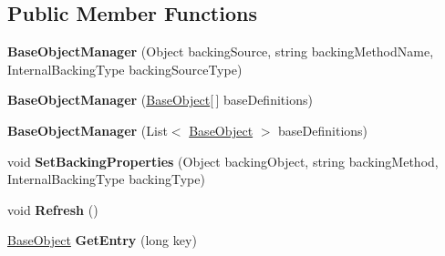 \subsection*{Public Member Functions}
\begin{DoxyCompactItemize}
\item 
\hypertarget{class_s_e_mod_a_p_i_internal_1_1_a_p_i_1_1_entity_1_1_base_object_manager_a69642b2f78b6751eb5fbea3c7a9bfd5d}{}{\bfseries Base\+Object\+Manager} (Object backing\+Source, string backing\+Method\+Name, Internal\+Backing\+Type backing\+Source\+Type)\label{class_s_e_mod_a_p_i_internal_1_1_a_p_i_1_1_entity_1_1_base_object_manager_a69642b2f78b6751eb5fbea3c7a9bfd5d}

\item 
\hypertarget{class_s_e_mod_a_p_i_internal_1_1_a_p_i_1_1_entity_1_1_base_object_manager_a27efb40f1e7172fd4911c3080168f550}{}{\bfseries Base\+Object\+Manager} (\hyperlink{class_s_e_mod_a_p_i_internal_1_1_a_p_i_1_1_entity_1_1_base_object}{Base\+Object}\mbox{[}$\,$\mbox{]} base\+Definitions)\label{class_s_e_mod_a_p_i_internal_1_1_a_p_i_1_1_entity_1_1_base_object_manager_a27efb40f1e7172fd4911c3080168f550}

\item 
\hypertarget{class_s_e_mod_a_p_i_internal_1_1_a_p_i_1_1_entity_1_1_base_object_manager_a8dbcd388b48cdcfe046a401454041401}{}{\bfseries Base\+Object\+Manager} (List$<$ \hyperlink{class_s_e_mod_a_p_i_internal_1_1_a_p_i_1_1_entity_1_1_base_object}{Base\+Object} $>$ base\+Definitions)\label{class_s_e_mod_a_p_i_internal_1_1_a_p_i_1_1_entity_1_1_base_object_manager_a8dbcd388b48cdcfe046a401454041401}

\item 
\hypertarget{class_s_e_mod_a_p_i_internal_1_1_a_p_i_1_1_entity_1_1_base_object_manager_a26d8d8f55e6a15f4cce8f327671daacc}{}void {\bfseries Set\+Backing\+Properties} (Object backing\+Object, string backing\+Method, Internal\+Backing\+Type backing\+Type)\label{class_s_e_mod_a_p_i_internal_1_1_a_p_i_1_1_entity_1_1_base_object_manager_a26d8d8f55e6a15f4cce8f327671daacc}

\item 
\hypertarget{class_s_e_mod_a_p_i_internal_1_1_a_p_i_1_1_entity_1_1_base_object_manager_a23372c0df29a43c4e40d5267cfadf9c9}{}void {\bfseries Refresh} ()\label{class_s_e_mod_a_p_i_internal_1_1_a_p_i_1_1_entity_1_1_base_object_manager_a23372c0df29a43c4e40d5267cfadf9c9}

\item 
\hypertarget{class_s_e_mod_a_p_i_internal_1_1_a_p_i_1_1_entity_1_1_base_object_manager_ac8e6187c830a5ce2a7e83ed2aa58127f}{}\hyperlink{class_s_e_mod_a_p_i_internal_1_1_a_p_i_1_1_entity_1_1_base_object}{Base\+Object} {\bfseries Get\+Entry} (long key)\label{class_s_e_mod_a_p_i_internal_1_1_a_p_i_1_1_entity_1_1_base_object_manager_ac8e6187c830a5ce2a7e83ed2aa58127f}


\end{DoxyCompactItemize}

